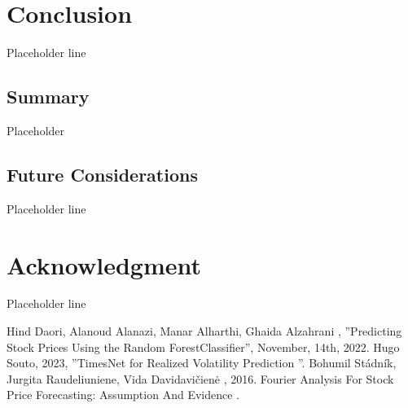 \documentclass{ieeeojies}
\begin{document}
\section{Conclusion}
 Placeholder line
\subsection{Summary}
Placeholder
\subsection{Future Considerations}
Placeholder line
\section*{Acknowledgment}
Placeholder line

\begin{thebibliography}{00}
 Hind Daori, Alanoud Alanazi, Manar Alharthi, Ghaida Alzahrani
 ,  ''Predicting Stock Prices Using the Random ForestClassifier'', November, 14th, 2022.
 Hugo Souto, 2023, ''TimesNet for Realized Volatility Prediction
''.
 Bohumil Stádník, Jurgita Raudeliuniene, Vida Davidavičienė , 2016. Fourier Analysis For Stock Price Forecasting: Assumption And Evidence .

\end{thebibliography}


\EOD
\end{document}

